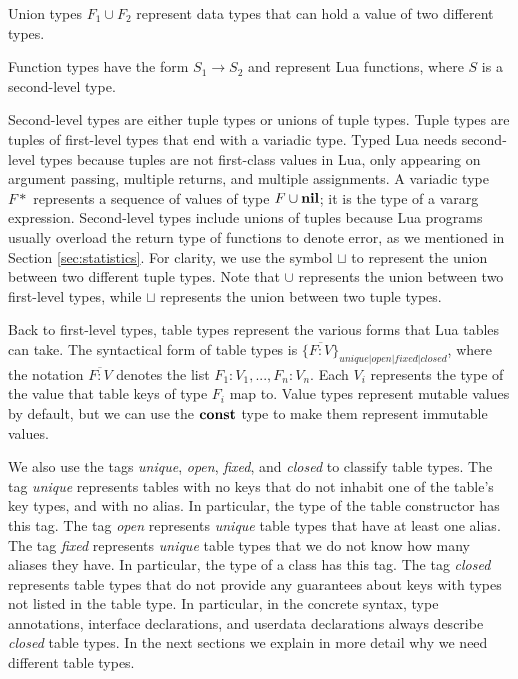 Union types $F_{1} \cup F_{2}$ represent data types that can hold a value
of two different types.

Function types have the form $S_{1} \rightarrow S_{2}$ and represent Lua functions,
where $S$ is a second-level type.

Second-level types are either tuple types or unions of tuple types.
Tuple types are tuples of first-level types that end with a variadic type.
Typed Lua needs second-level types because tuples are not first-class
values in Lua, only appearing on argument passing, multiple returns,
and multiple assignments.
A variadic type $F{*}$ represents a sequence of values of type $F \cup \mathbf{nil}$;
it is the type of a vararg expression.
Second-level types include unions of tuples because Lua programs
usually overload the return type of functions to denote error,
as we mentioned in Section \ref{sec:statistics}.
For clarity, we use the symbol $\sqcup$ to represent the union between
two different tuple types.
Note that $\cup$ represents the union between two first-level types,
while $\sqcup$ represents the union between two tuple types.

Back to first-level types, table types represent the various forms
that Lua tables can take.
The syntactical form of table types is $\{\overline{F{:}V}\}_{unique|open|fixed|closed}$,
where the notation $\overline{F{:}V}$ denotes the list $F_{1}{:}V_{1}, ..., F_{n}{:}V_{n}$.
Each $V_{i}$ represents the type of the value that table keys of type $F_{i}$ map to.
Value types represent mutable values by default, but we can use the
$\mathbf{const}$ type to make them represent immutable values. 

We also use the tags \emph{unique}, \emph{open}, \emph{fixed}, and \emph{closed}
to classify table types.
The tag \emph{unique} represents tables with no keys that do not
inhabit one of the table's key types, and with no alias.
In particular, the type of the table constructor has this tag.
The tag \emph{open} represents \emph{unique} table types that
have at least one alias.
The tag \emph{fixed} represents \emph{unique} table types that we
do not know how many aliases they have.
In particular, the type of a class has this tag.
The tag \emph{closed} represents table types that do not provide
any guarantees about keys with types not listed in the table type.
In particular, in the concrete syntax, type annotations, interface
declarations, and userdata declarations always describe \emph{closed} table types.
In the next sections we explain in more detail why we need
different table types.

